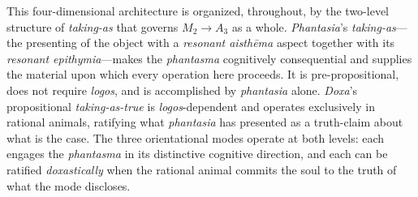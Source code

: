 \documentclass{article}
\begin{document}
This four-dimensional architecture is organized, throughout, by the two-level structure of \textit{taking-as} that governs $M_2 \rightarrow A_3$ as a whole. \textit{Phantasia}'s \textit{taking-as}---the presenting of the object with a \textit{resonant aisthēma} aspect together with its \textit{resonant epithymia}---makes the \textit{phantasma} cognitively consequential and supplies the material upon which every operation here proceeds. It is pre-propositional, does not require \textit{logos}, and is accomplished by \textit{phantasia} alone. \textit{Doxa}'s propositional \textit{taking-as-true} is \textit{logos}-dependent and operates exclusively in rational animals, ratifying what \textit{phantasia} has presented as a truth-claim about what is the case. The three orientational modes operate at both levels: each engages the \textit{phantasma} in its distinctive cognitive direction, and each can be ratified \textit{doxastically} when the rational animal commits the soul to the truth of what the mode discloses. 
\end{document}
